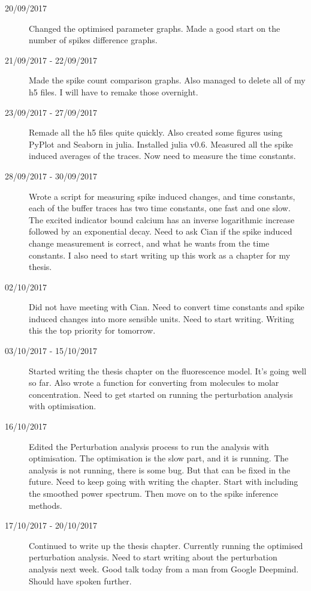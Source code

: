 \documentclass[a4paper,12pt]{article}
\theoremstyle{definition}
\begin{document}
\begin{description}
  \item[20/09/2017] Changed the optimised parameter graphs. Made a good start on the number of spikes difference graphs.

  \item[21/09/2017 - 22/09/2017] Made the spike count comparison graphs. Also managed to delete all of my h5 files. I will have to remake those overnight.

  \item[23/09/2017 - 27/09/2017] Remade all the h5 files quite quickly. Also created some figures using PyPlot and Seaborn in julia. Installed julia v0.6. Measured all the spike induced averages of the traces. Now need to measure the time constants.

  \item[28/09/2017 - 30/09/2017] Wrote a script for measuring spike induced changes, and time constants, each of the buffer traces has two time constants, one fast and one slow. The excited indicator bound calcium has an inverse logarithmic increase followed by an exponential decay. Need to ask Cian if the spike induced change measurement is correct, and what he wants from the time constants. I also need to start writing up this work as a chapter for my thesis.

  \item[02/10/2017] Did not have meeting with Cian. Need to convert time constants and spike induced changes into more sensible units. Need to start writing. Writing this the top priority for tomorrow.

  \item[03/10/2017 - 15/10/2017] Started writing the thesis chapter on the fluorescence model. It's going well so far. Also wrote a function for converting from molecules to molar concentration. Need to get started on running the perturbation analysis with optimisation.

  \item[16/10/2017] Edited the Perturbation analysis process to run the analysis with optimisation. The optimisation is the slow part, and it is running. The analysis is not running, there is some bug. But that can be fixed in the future. Need to keep going with writing the chapter. Start with including the smoothed power spectrum. Then move on to the spike inference methods.

  \item[17/10/2017 - 20/10/2017] Continued to write up the thesis chapter. Currently running the optimised perturbation analysis. Need to start writing about the perturbation analysis next week. Good talk today from a man from Google Deepmind. Should have spoken further.


\end{description}
\end{document}
